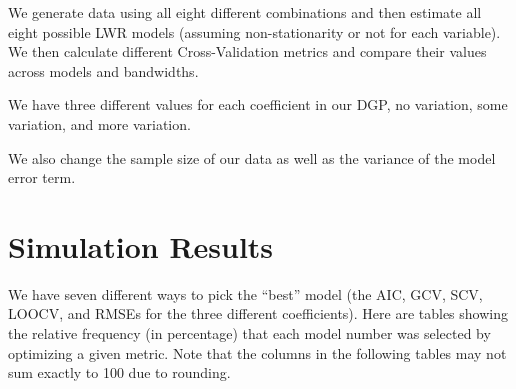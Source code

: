 \documentclass{article}\usepackage[]{graphicx}\usepackage[]{color}
\begin{document}
We generate data using all eight different combinations and then estimate all eight possible LWR models (assuming non-stationarity or not for each variable). We then calculate different Cross-Validation metrics and compare their values across models and bandwidths. 

We have three different values for each coefficient in our DGP, no variation, some variation, and more variation.

We also change the sample size of our data as well as the variance of the model error term.

\section{Simulation Results}

We have seven different ways to pick the ``best'' model (the AIC, GCV, SCV, LOOCV, and RMSEs for the three different coefficients). Here are tables showing the relative frequency (in percentage) that each model number was selected by optimizing a given metric. Note that the columns in the following tables may not sum exactly to 100 due to rounding.
\end{document}
